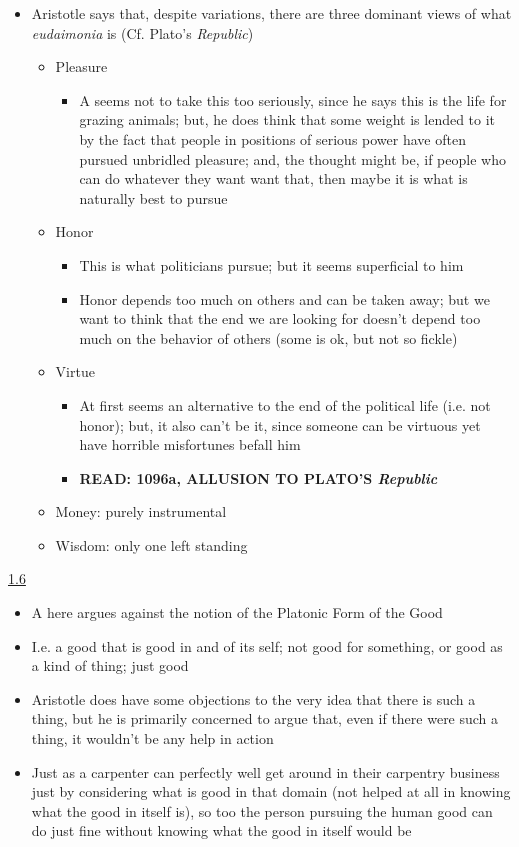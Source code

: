 \documentclass[11pt]{article}
\begin{document}
\begin{itemize}
\begin{itemize}\item{Aristotle says that, despite variations, there are three dominant views of what \emph{eudaimonia} is (Cf. Plato's \emph{Republic})}\begin{itemize}\item{Pleasure}\begin{itemize}\item{A seems not to take this too seriously, since he says this is the life for grazing animals; but, he does think that some weight is lended to it by the fact that people in positions of serious power have often pursued unbridled pleasure; and, the thought might be, if people who can do whatever they want want that, then maybe it is what is naturally best to pursue}\end{itemize}\item{Honor}\begin{itemize}\item{This is what politicians pursue; but it seems superficial to him}\item{Honor depends too much on others and can be taken away; but we want to think that the end we are looking for doesn't depend too much on the behavior of others (some is ok, but not so fickle)}\end{itemize}\item{Virtue}\begin{itemize}\item{At first seems an alternative to the end of the political life (i.e. not honor); but, it also can't be it, since someone can be virtuous yet have horrible misfortunes befall him}\item{\textbf{READ: 1096a, ALLUSION TO PLATO'S \emph{Republic}}}\end{itemize}\item{Money: purely instrumental}\item{Wisdom: only one left standing}\end{itemize}\end{itemize}

\end{itemize}

\noindent\underline{1.6}

\begin{itemize}\item{A here argues against the notion of the Platonic Form of the Good}\item{I.e. a good that is good in and of its self; not good for something, or good as a kind of thing; just good}\item{Aristotle does have some objections to the very idea that there is such a thing, but he is primarily concerned to argue that, even if there were such a thing, it wouldn't be any help in action}\item{Just as a carpenter can perfectly well get around in their carpentry business just by considering what is good in that domain (not helped at all in knowing what the good in itself is), so too the person pursuing the human good can do just fine without knowing what the good in itself would be}\end{itemize}
\end{document}
